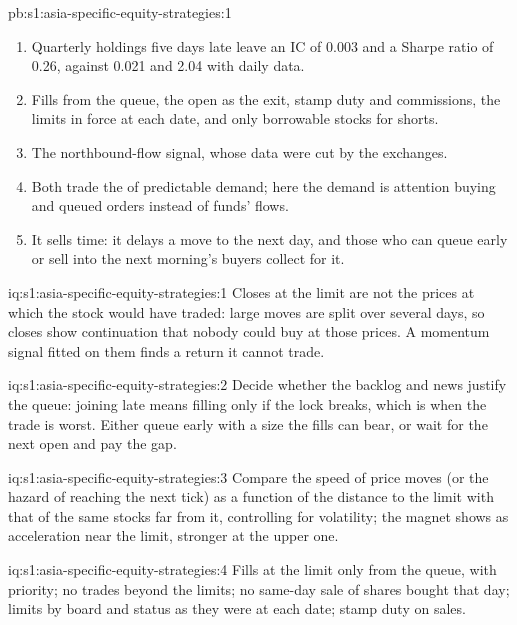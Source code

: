 \begin{solution}{pb:s1:asia-specific-equity-strategies:1}
\begin{enumerate}
\item Quarterly holdings five days late leave an IC of 0.003 and a Sharpe ratio of 0.26, against 0.021 and 2.04 with daily data.
\item Fills from the queue, the open as the exit, stamp duty and commissions, the limits in force at each date, and only borrowable stocks for shorts.
\item The northbound-flow signal, whose data were cut by the exchanges.
\item Both trade the  of predictable demand; here the demand is attention buying and queued orders instead of funds' flows.
\item It sells time: it delays a move to the next day, and those who can queue early or sell into the next morning's buyers collect for it.
\end{enumerate}
\end{solution}

\begin{solution}{iq:s1:asia-specific-equity-strategies:1}
Closes at the limit are not the prices at which the stock would have traded: large moves are split over several days, so closes show continuation
that nobody could buy at those prices. A momentum signal fitted on them finds a return it cannot trade.
\end{solution}

\begin{solution}{iq:s1:asia-specific-equity-strategies:2}
Decide whether the backlog and news justify the queue: joining late means filling only if the lock breaks, which is when the trade is worst. Either
queue early with a size the fills can bear, or wait for the next open and pay the gap.
\end{solution}

\begin{solution}{iq:s1:asia-specific-equity-strategies:3}
Compare the speed of price moves (or the hazard of reaching the next tick) as a function of the distance to the limit with that of the same stocks far
from it, controlling for volatility; the magnet shows as acceleration near the limit, stronger at the upper one.
\end{solution}

\begin{solution}{iq:s1:asia-specific-equity-strategies:4}
Fills at the limit only from the queue, with priority; no trades beyond the limits; no same-day sale of shares bought that day; limits by board and
status as they were at each date; stamp duty on sales.
\end{solution}

